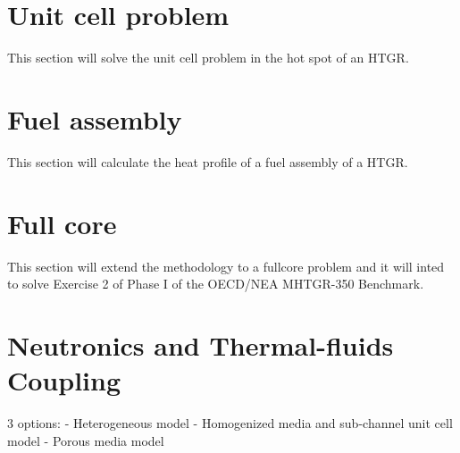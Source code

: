 \section{Unit cell problem}

This section will solve the unit cell problem in the hot spot of an HTGR.

\section{Fuel assembly}

This section will calculate the heat profile of a fuel assembly of a HTGR.

\section{Full core}

This section will extend the methodology to a fullcore problem and it will inted to solve Exercise 2 of Phase I of the OECD/NEA MHTGR-350 Benchmark.




\section{Neutronics and Thermal-fluids Coupling}

3 options:
- Heterogeneous model
- Homogenized media and sub-channel unit cell model
- Porous media model


